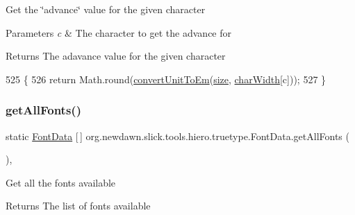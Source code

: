 Get the \char`\"{}advance\char`\"{} value for the given character


\begin{DoxyParams}{Parameters}
{\em c} & The character to get the advance for \\
\hline
\end{DoxyParams}
\begin{DoxyReturn}{Returns}
The adavance value for the given character 
\end{DoxyReturn}

\begin{DoxyCode}
525                                     \{
526         \textcolor{keywordflow}{return} Math.round(\mbox{\hyperlink{classorg_1_1newdawn_1_1slick_1_1tools_1_1hiero_1_1truetype_1_1_font_data_ae82293147d863b46f9c3d52cfc75771b}{convertUnitToEm}}(\mbox{\hyperlink{classorg_1_1newdawn_1_1slick_1_1tools_1_1hiero_1_1truetype_1_1_font_data_a96af538e2a7368fdba46ffc2ad6a9a0e}{size}}, \mbox{\hyperlink{classorg_1_1newdawn_1_1slick_1_1tools_1_1hiero_1_1truetype_1_1_font_data_a2080ecdf80e54bb38848255c70b43706}{charWidth}}[c]));
527     \}
\end{DoxyCode}
\mbox{\label{classorg_1_1newdawn_1_1slick_1_1tools_1_1hiero_1_1truetype_1_1_font_data_a24c78b670366c2eacffbf3b471d9d021}} 
\subsubsection{\texorpdfstring{get\+All\+Fonts()}{getAllFonts()}}
{\footnotesize\ttfamily static \mbox{\hyperlink{classorg_1_1newdawn_1_1slick_1_1tools_1_1hiero_1_1truetype_1_1_font_data}{Font\+Data}} \mbox{[}$\,$\mbox{]} org.\+newdawn.\+slick.\+tools.\+hiero.\+truetype.\+Font\+Data.\+get\+All\+Fonts (\begin{DoxyParamCaption}{ }\end{DoxyParamCaption})\hspace{0.3cm}{\ttfamily [inline]}, {\ttfamily [static]}}

Get all the fonts available

\begin{DoxyReturn}{Returns}
The list of fonts available 
\end{DoxyReturn}

